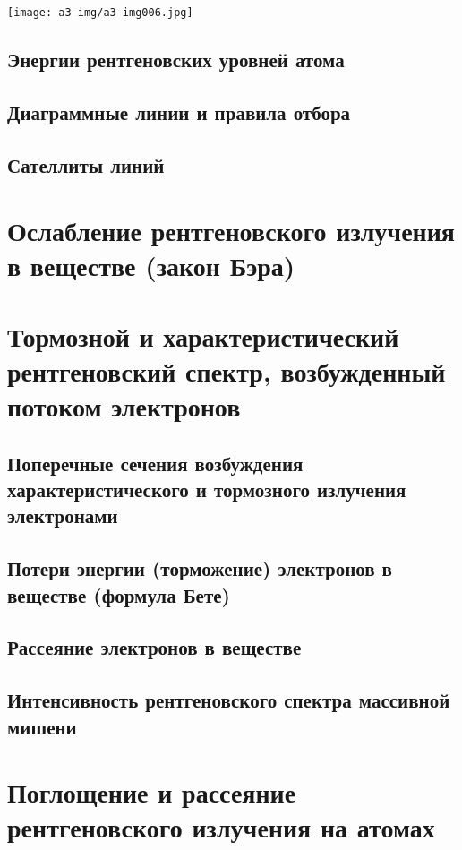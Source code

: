 \documentclass[a4paper,14pt, openany, twoside, draft]{extbook} %
\begin{document}
 \texttt{[image: a3-img/a3-img006.jpg]}


\section{Энергии рентгеновских уровней атома}
\label{sec:rentgen-levels}

\section{Диаграммные линии и правила отбора}
\label{sec:diag-lines}

\section{Сателлиты линий}
\label{sec:sattelit-lines}

\chapter{Ослабление рентгеновского излучения в веществе (закон Бэра)}
\label{cha:}

\chapter{Тормозной и характеристический рентгеновский спектр, возбужденный потоком электронов}
\label{cha:torm-spec}

\section{Поперечные сечения возбуждения характеристического и тормозного излучения электронами}
\label{sec:sections}

\section{Потери энергии (торможение) электронов в веществе (формула Бете)}
\section{Рассеяние электронов в веществе}
\section{Интенсивность рентгеновского спектра массивной мишени}

\chapter{Поглощение и рассеяние рентгеновского излучения на атомах}
\label{cha:absorbtion}
\end{document}
